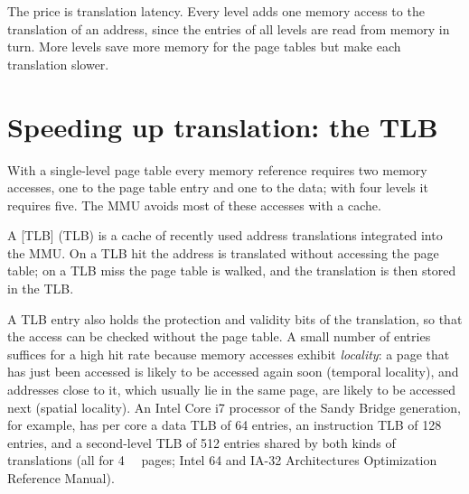 \documentclass[../main.tex]{subfiles}
\begin{document}
The price is translation latency.  Every level adds one memory access to
the translation of an address, since the entries of all levels are read
from memory in turn.  More levels save more memory for the page tables but
make each translation slower.

\section{Speeding up translation: the TLB}
\label{sec:l08-tlb}

With a single-level page table every memory reference requires two memory
accesses, one to the page table entry and one to the data; with four levels
it requires five.  The MMU avoids most of these accesses with a
cache.

\begin{definition}
  A
  [TLB]
  (TLB) is a cache of recently used address translations integrated into
  the MMU.  On a TLB hit the address is translated without accessing the
  page table; on a TLB miss the page table is walked, and the translation
  is then stored in the TLB.
\end{definition}

A TLB entry also holds the protection and validity bits of the translation,
so that the access can be checked without the page table.  A small
number of entries suffices for a high hit rate because memory accesses
exhibit \emph{locality}: a page that has just been accessed is likely to be
accessed again soon (temporal locality), and addresses close to it, which
usually lie in the same page, are likely to be accessed next (spatial
locality).  An Intel Core i7 processor of the Sandy Bridge generation, for
example, has per core a data TLB of 64 entries, an instruction TLB of 128
entries, and a second-level TLB of 512 entries shared by both kinds of
translations (all for \SI{4}{\kibi\byte} pages; Intel 64 and IA-32
Architectures Optimization Reference Manual).
\end{document}

